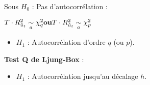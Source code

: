 \begin{f}[Détection]
\begin{itemize}[leftmargin=*]
Sous $H_{0}$ : Pas d'autocorrélation :

\begin {center}
$\hfill T \cdot R^{2}_{\hat{u}_t}\underset{a}{\sim}\chi^{2}_{q} \hfill \textbf{ou} \hfill T \cdot R^{2}_{\hat{u}_t}\underset{a}{\sim}\chi^{2}_{p} \hfill$
\end{center}

\begin{itemize}[leftmargin=*]
\item $H_{1}$ : Autocorrélation d'ordre $q$ (ou $p$).
\end{itemize}

\textbf{Test Q de Ljung-Box} :

\begin{itemize}[leftmargin=*]
\item $H_{1}$ : Autocorrélation jusqu'au décalage $h$.
\end{itemize}

\end{itemize}



\end{f}  

